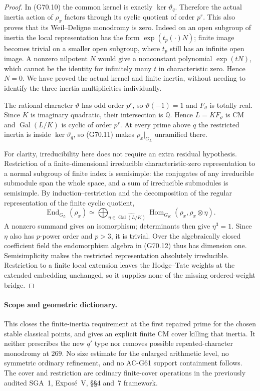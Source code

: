 \begin{proof}
In (G70.10) the common kernel is exactly
$\ker\vartheta_q$.  Therefore the actual inertia action
of $\rho_x$ factors through its cyclic quotient of order
$p^r$.  This also proves that its Weil--Deligne monodromy
is zero.  Indeed on an open subgroup of inertia the
local representation has the form $\exp(t_p(\cdot)N)$;
finite image becomes trivial on a smaller open subgroup,
where $t_p$ still has an infinite open image.  A nonzero
nilpotent $N$ would give a nonconstant polynomial
$\exp(tN)$, which cannot be the identity for infinitely
many $t$ in characteristic zero.  Hence $N=0$.
We have proved the actual kernel and finite inertia,
without needing to identify the three inertia
multiplicities individually.

The rational character $\vartheta$ has odd order $p^r$,
so $\vartheta(-1)=1$ and $F_\vartheta$ is totally real.
Since $K$ is imaginary quadratic, their intersection
is $\mathbb Q$.  Hence $L=KF_\vartheta$ is CM and
$\operatorname{Gal}(L/K)$ is cyclic of order $p^r$.
At every prime above $q$ the restricted inertia is
inside $\ker\vartheta_q$, so (G70.11) makes
$\rho_x|_{G_L}$ unramified there.

For clarity, irreducibility here does not require an
extra residual hypothesis.  Restriction of a finite-dimensional
irreducible characteristic-zero representation to a
normal subgroup of finite index is semisimple: the
conjugates of any irreducible submodule span the whole
space, and a sum of irreducible submodules is semisimple.
By induction--restriction and the decomposition of the
regular representation of the finite cyclic quotient,
\[
 \operatorname{End}_{G_L}(\rho_x)
   \simeq\bigoplus_{\eta\in\widehat{\operatorname{Gal}(L/K)}}
                    \operatorname{Hom}_{G_K}(\rho_x,\rho_x\otimes\eta).
                                                        \tag{G70.12}
\]
A nonzero summand gives an isomorphism; determinants
then give $\eta^3=1$.  Since $\eta$ also has $p$-power
order and $p>3$, it is trivial.  Over the algebraically
closed coefficient field the endomorphism algebra in
(G70.12) thus has dimension one.  Semisimplicity makes
the restricted representation absolutely irreducible.
Restriction to a finite local extension leaves the
Hodge--Tate weights at the extended embedding unchanged,
so it supplies none of the missing ordered-weight bridge.
\end{proof}

\paragraph{Scope and geometric dictionary.}
This closes the finite-inertia requirement at the first
repaired prime for the chosen stable classical points,
and gives an explicit finite CM cover killing that
inertia.  It neither prescribes the new $q'$ type nor
removes possible repeated-character monodromy at $269$.
No size estimate for the enlarged arithmetic level,
no symmetric ordinary refinement, and no AC-G61 support
containment follows.  The cover and restriction are
ordinary finite-cover operations in the previously
audited SGA~1, Expos\'e~V, \S\S4 and~7 framework.
